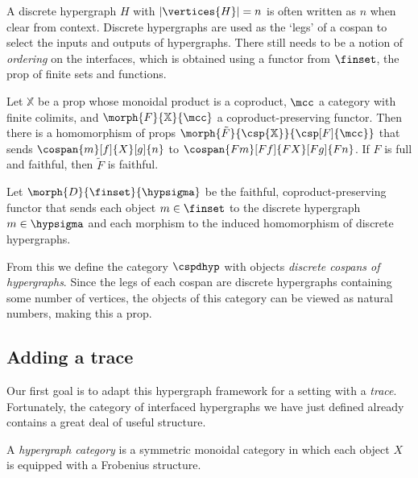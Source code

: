 \noindent
A discrete hypergraph \(H\) with \(|\vertices{H}| = n\) is often written as
\(n\) when clear from context.
Discrete hypergraphs are used as the `legs' of a cospan to select the inputs and
outputs of hypergraphs.
There still needs to be a notion of \emph{ordering} on the interfaces, which is
obtained using a functor from \(\finset\), the prop of finite sets and
functions.

\begin{theorem}
    \label{thm:cospan-homomorphism}
    Let \(\mathbb{X}\) be a prop whose monoidal product is a coproduct, \(\mcc\)
    a category with finite colimits, and \(\morph{F}{\mathbb{X}}{\mcc}\) a
    coproduct-preserving functor.
    Then there is a homomorphism of props \(
        \morph{\tilde{F}}{\csp{\mathbb{X}}}{\csp[F]{\mcc}}
    \) that sends \(\cospan{m}[f]{X}[g]{n}\) to \(\cospan{Fm}[Ff]{FX}[Fg]{Fn}\).
    If \(F\) is full and faithful, then \(\tilde{F}\) is faithful.
\end{theorem}

\begin{definition}
    Let \(\morph{D}{\finset}{\hypsigma}\) be the faithful, coproduct-preserving
    functor that sends each object \(m \in \finset\) to the discrete hypergraph
    \(m \in \hypsigma\) and each morphism to the induced homomorphism of
    discrete hypergraphs.
\end{definition}

\noindent
From this we define the category \(\cspdhyp\) with objects
\emph{discrete cospans of hypergraphs}.
Since the legs of each cospan are discrete hypergraphs containing some number of
vertices, the objects of this category can be viewed as natural numbers, making
this a prop.

\subsection{Adding a trace}

Our first goal is to adapt this hypergraph framework for a setting with a
\emph{trace}.
Fortunately, the category of interfaced hypergraphs we have just defined already
contains a great deal of useful structure.

\begin{definition}
    A \emph{hypergraph category} is a symmetric monoidal category in which each
    object \(X\) is equipped with a Frobenius structure.
\end{definition}

